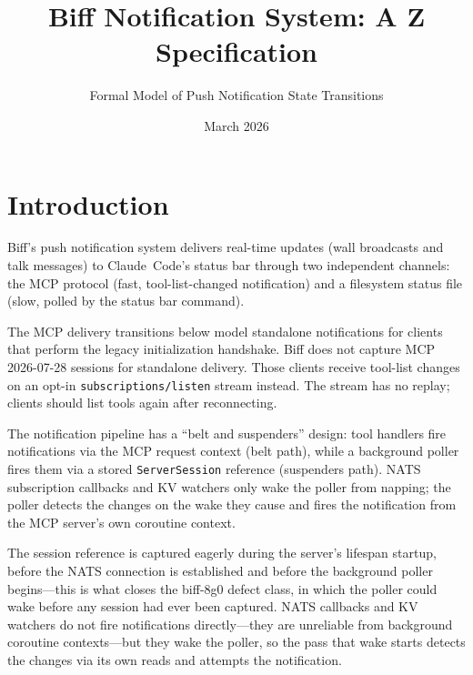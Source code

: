 \documentclass[a4paper,10pt,fleqn]{article}
\begin{document}
\title{Biff Notification System: A Z Specification}
\author{Formal Model of Push Notification State Transitions}
\date{March 2026}
\maketitle

\tableofcontents
\newpage

\section{Introduction}

Biff's push notification system delivers real-time updates (wall
broadcasts and talk messages) to Claude~Code's status bar through two
independent channels: the MCP protocol (fast, tool-list-changed
notification) and a filesystem status file (slow, polled by the status
bar command).

The MCP delivery transitions below model standalone notifications for
clients that perform the legacy initialization handshake. Biff does
not capture MCP 2026-07-28 sessions for standalone delivery. Those
clients receive tool-list changes on an opt-in
\texttt{subscriptions/listen} stream instead. The stream has no replay;
clients should list tools again after reconnecting.

The notification pipeline has a ``belt and suspenders'' design: tool
handlers fire notifications via the MCP request context (belt path),
while a background poller fires them via a stored
\texttt{ServerSession} reference (suspenders path).  NATS subscription
callbacks and KV watchers only wake the poller from napping; the
poller detects the changes on the wake they cause and fires the
notification from the MCP server's own coroutine context.

The session reference is captured eagerly during the server's lifespan
startup, before the NATS connection is established and before the
background poller begins---this is what closes the biff-8g0 defect
class, in which the poller could wake before any session had ever been
captured.  NATS callbacks and KV watchers do not fire notifications
directly---they are unreliable from background coroutine
contexts---but they wake the poller, so the pass that wake starts
detects the changes via its own reads and attempts
the notification.
\end{document}
